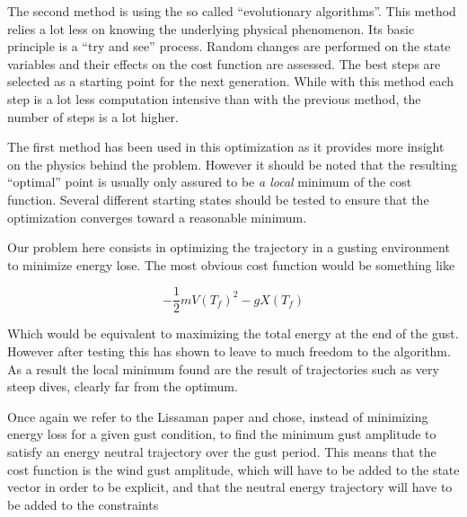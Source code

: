     \par The second method is using the so called ``evolutionary algorithms''. 
    This method relies a lot less on knowing the underlying physical phenomenon.
    Its basic principle is a ``try and see'' process.
    Random changes are performed on the state variables and their effects on the cost function are assessed.
    The best steps are selected as a starting point for the next generation.
    While with this method each step is a lot less computation intensive than with the previous method, the number of steps is a lot higher.

    \par The first method has been used in this optimization as it provides more insight on the physics behind the problem.
    However it should be noted that the resulting ``optimal'' point is usually only assured to be \emph{a local} minimum of the cost function.
    Several different starting states should be tested to ensure that the optimization converges toward a reasonable minimum.



    Our problem here consists in optimizing the trajectory in a gusting environment to minimize energy lose.
    The most obvious cost function would be something like

    \begin{equation}
      - \frac{1}{2}m{V(T_f)}^2 - gX(T_f)
      \label{eqn:eni_cost_fun}
    \end{equation}

    Which would be equivalent to maximizing the total energy at the end of the gust.
    However after testing this has shown to leave to much freedom to the algorithm. 
    As a result the local minimum found are the result of trajectories such as very steep dives, clearly far from the optimum.

    \par Once again we refer to the Lissaman paper \cite{Lissaman2007neutral} and chose, instead of minimizing energy loss for a given gust condition, to find the minimum gust amplitude to satisfy an energy neutral trajectory over the gust period.
    This means that the cost function is the wind gust amplitude, which will have to be added to the state vector in order to be explicit, and that the neutral energy trajectory will have to be added to the constraints

